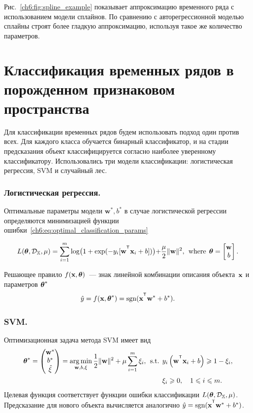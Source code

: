 Рис.~\ref{ch6:fig:spline_example} показывает аппроксимацию временного ряда с использованием модели сплайнов.
По сравнению с авторегрессионной моделью сплайны строят более гладкую аппроксимацию, используя такое же количество параметров.

\section{Классификация временных рядов в порожденном признаковом пространства}
\label{sec:ch6:feature_generation_classification}

Для классификации временных рядов будем использовать подход один против всех. 
Для каждого класса обучается бинарный классификатор, и на стадии предсказания объект классифицируется согласно наиболее уверенному классификатору.
Использовались три модели классификации: логистическая регрессия, SVM и случайный лес.

\subsubsection{Логистическая регрессия.}
Оптимальные параметры модели $\mathbf{w}^*, b^*$  в случае логистической регрессии определяются минимизацией функции ошибки~\eqref{ch6:eq:optimal_classification_params}

\begin{equation*}
	L(\btheta, \mathcal{D}_\bbX, \mu) = \sum_{i=1}^{m} \log\bigl(1 + \exp(-y_i [\mathbf{w}^{\T} \bx_i + b])\bigl) + \frac{\mu}{2} \|\mathbf{w}\|^2, \:\:\mbox{where}\:\: \btheta  = \begin{bmatrix}
	\mathbf{w} \\ b
	\end{bmatrix}.
\end{equation*}

Решающее правило $f(\mathbf{x}, \boldsymbol{\theta})$~--- знак линейной комбинации описания объекта~$\mathbf{x}$ и параметров $\boldsymbol{\theta}^*$
\begin{equation*}
	\hat{y} = f(\bx, \btheta^*) = \sgn(\bx^{\T} \mathbf{w}^* + b^*).
\end{equation*}

\subsubsection{SVM.}
Оптимизационная задача метода SVM имеет вид
\begin{align*}
	\btheta^*  = 
	\begin{pmatrix}
		\mathbf{w}^* \\ 
		b^* \\ 
		\hat{\mathbf{\xi}}
	\end{pmatrix}
	= \argmin_{\mathbf{w}, b, \mathbf{\xi}}  \frac{1}{2} \|\mathbf{w}\|^2 + \mu \sum_{i=1}^{m} \xi_i,\:\:
	\mbox{s.t.} \:\: &y_i \left(\mathbf{w}^{\T} \bx_i + b\right) \geq 1 - \xi_i,\\
	&\xi_i \geq 0, \quad 1 \leq i \leq m.
\end{align*}
Целевая функция соответствует функции ошибки классификации $L(\boldsymbol{\theta}, \mathcal{D}_{\mathbb{X}}, \mu)$.
Предсказание для нового объекта вычисляется аналогично $
\hat{y} = \sgn (\bx^{\T} \mathbf{w}^* + b^*)$.

